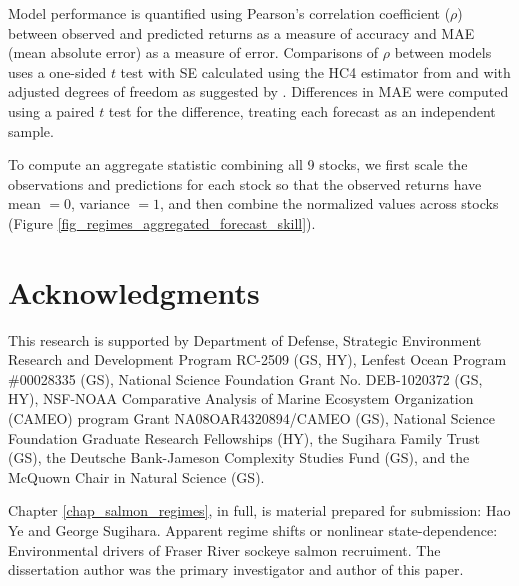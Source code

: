 Model performance is quantified using Pearson's correlation coefficient ($\rho$) between observed and predicted returns as a measure of accuracy and MAE (mean absolute error) as a measure of error. Comparisons of $\rho$ between models uses a one-sided $t$ test with SE calculated using the HC4 estimator from \cite{Cribari-Neto_2004} and with adjusted degrees of freedom as suggested by \cite{Wilcox_2009}. Differences in MAE were computed using a paired $t$ test for the difference, treating each forecast as an independent sample.

To compute an aggregate statistic combining all 9 stocks, we first scale the observations and predictions for each stock so that the observed returns have mean $= 0$, variance $= 1$, and then combine the normalized values across stocks (Figure \ref{fig_regimes_aggregated_forecast_skill}).

\section{Acknowledgments}
This research is supported by Department of Defense, Strategic Environment Research and Development Program RC-2509 (GS, HY), Lenfest Ocean Program \#00028335 (GS), National Science Foundation Grant No. DEB-1020372 (GS, HY), NSF-NOAA Comparative Analysis of Marine Ecosystem Organization (CAMEO) program Grant NA08OAR4320894/CAMEO (GS), National Science Foundation Graduate Research Fellowships (HY), the Sugihara Family Trust (GS), the Deutsche Bank-Jameson Complexity Studies Fund (GS), and the McQuown Chair in Natural Science (GS).

Chapter \ref{chap_salmon_regimes}, in full, is material prepared for submission: Hao Ye and George Sugihara. Apparent regime shifts or nonlinear state-dependence: Environmental drivers of Fraser River sockeye salmon recruiment. The dissertation author was the primary investigator and author of this paper.